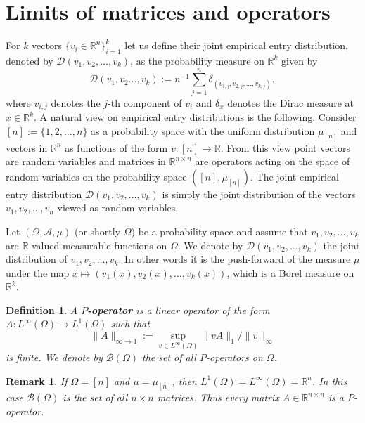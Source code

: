 \documentclass[a4wider]{amsart}
\newtheorem{definition}[theorem]{Definition}
\newtheorem{remarka}[theorem]{Remark}
\theoremstyle{definitionbreak}\newtheorem{D}[theorem]{Definition}
\theoremstyle{definitionbreak}\newtheorem*{D*}{Definition}
\begin{document}
\section{Limits of matrices and operators} \label{chaplim}


For $k$ vectors $\{v_i\in\mathbb{R}^n\}_{i=1}^k$ let us define their joint empirical entry distribution,  denoted by $\mathcal{D}(v_1,v_2,\dots,v_k)$, as the probability measure on $\mathbb{R}^k$ given by
\begin{equation}\label{empeq}
\mathcal{D}(v_1,v_2\dots,v_k):=n^{-1}\sum_{j=1}^n \delta_{(v_{1,j},v_{2,j},\dots,v_{k,j})},
\end{equation}
where $v_{i,j}$ denotes the $j$-th component of $v_i$ and $\delta_x$ denotes the Dirac measure at $x\in\mathbb{R}^k$. A natural view on empirical entry distributions is the following. Consider $[n]:=\{1,2,\dots,n\}$ as a probability space with the uniform distribution $\mu_{[n]}$ and vectors in $\mathbb{R}^n$ as functions of the form $v:[n]\to\mathbb{R}$. From this view point vectors are random variables and matrices in $\mathbb{R}^{n\times n}$ are operators acting on the space of random variables on the probability space $([n],\mu_{[n]})$. The joint empirical entry distribution $\mathcal{D}(v_1,v_2,\dots,v_k)$ is simply the joint distribution of the vectors $v_1,v_2,\dots,v_n$ viewed as random variables. 

Let $(\Omega,\mathcal{A},\mu)$ (or shortly $\Omega$) be a probability space and assume that $v_1,v_2,\dots,v_k$ are $\mathbb{R}$-valued measurable functions on $\Omega$. We denote by $\mathcal{D}(v_1,v_2,\dots,v_k)$ the joint distribution of $v_1,v_2,\dots,v_k$. In other words it is the push-forward of the measure $\mu$ under the map $x\mapsto (v_1(x),v_2(x),\dots,v_k(x))$, which is a Borel measure on $\mathbb{R}^k$. 

\begin{definition}\label{def:pop} A {\bf $P$-operator} is a linear operator of the form $A:L^\infty(\Omega)\to L^1(\Omega)$ such that $$\|A\|_{\infty\to 1}:=\sup_{v\in L^\infty(\Omega)}\|vA\|_1/\|v\|_\infty$$ is finite. We denote by $\mathcal{B}(\Omega)$ the set of all $P$-operators on $\Omega$. 
\end{definition}



\begin{remarka} If $\Omega=[n]$ and $\mu=\mu_{[n]}$, then $L^1(\Omega)=L^\infty(\Omega)=\mathbb{R}^n$. In this case $\mathcal{B}(\Omega)$ is the set of all $n\times n$ matrices. Thus every matrix $A\in\mathbb{R}^{n\times n}$ is a $P$-operator. 
\end{remarka}
\end{document}
